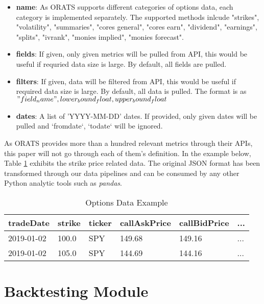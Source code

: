 \documentclass[12pt]{article}
\begin{document}
\begin{itemize}
    \item \textbf{name}: As ORATS supports different categories of options data, each category is implemented separately. The supported methods inlcude "strikes", "volatility", "summaries", "cores general", "cores earn", "dividend", "earnings", "splits", "ivrank", "monies implied", "monies forecast".
    \item \textbf{fields}: If given, only given metrics will be pulled from API, this would be useful if requried data size is large. By default, all fields are pulled.
    \item \textbf{filters}: If given, data will be filtered from API, this would be useful if required data size is large. By default, all data is pulled. The format is as \("field_name", lower_bound_float, upper_bound_float\)
    \item \textbf{dates}: A list of 'YYYY-MM-DD' dates. If provided, only given dates will be pulled and `fromdate`, `todate` will be ignored.
\end{itemize}

As ORATS provides more than a hundred relevant metrics through their APIs, this paper will not go through each of them's definition. In the example below, Table \ref{table:options} exhibits the strike price related data. The original JSON format has been transformed through our data pipelines and can be consumed by any other Python analytic tools such as \textit{pandas}.

\begin{table}[H]
\centering
\begin{tabular}{@{}llllll@{}}
\toprule
\textbf{tradeDate} & \textbf{strike} & \textbf{ticker} & \textbf{callAskPrice} & \textbf{callBidPrice} & \textbf{...} \\ \midrule
2019-01-02         & 100.0           & SPY             & 149.68                & 149.16                & ...          \\
2019-01-02         & 105.0           & SPY             & 144.69                & 144.16                & ...          \\ \bottomrule
\end{tabular}
\caption{Options Data Example}
\label{table:options}
\end{table}

\section{Backtesting Module}
\end{document}
